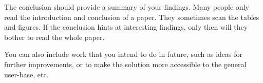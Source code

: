 \label{Ch:Conclusion}

The conclusion should provide a summary of your findings.  Many people only read the introduction and conclusion of a paper.  They sometimes scan the tables and figures.  If the conclusion hints at interesting findings, only then will they bother to read the whole paper.

You can also include work that you intend to do in future, such as ideas for further improvements, or to make the solution more accessible to the general user-base, etc.
